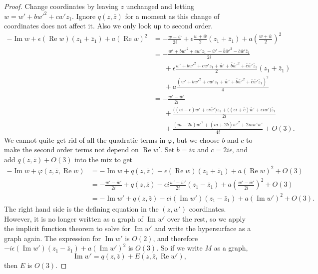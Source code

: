 \documentclass[12pt,openany]{book}
\renewcommand{\Re}{\operatorname{Re}}
\renewcommand{\Im}{\operatorname{Im}}
\theoremstyle{plain}
\theoremstyle{remark}
\theoremstyle{definition}
\theoremstyle{exercise}
\theoremstyle{example}
\begin{document}
\begin{proof}
Change coordinates
by leaving $z$ unchanged and letting $w = w'+bw'^2+cw'z_1$.  Ignore $q(z,\bar{z})$ for a moment as
this change of coordinates does not affect it.  Also we only look up to
second order.
\begin{equation*}
\begin{split}
-\Im w +
\epsilon (\Re w) (z_1+\bar{z}_1)
+
a {(\Re w)}^2
& =
-\frac{w-\bar{w}}{2i} +
\epsilon \frac{w+\bar{w}}{2}(z_1+\bar{z}_1)
+
a{\left(\frac{w+\bar{w}}{2}\right)}^2
\\
& =
-\frac{w'+bw'^2+cw'z_1-\bar{w}'-\bar{b}\bar{w}'^2-\bar{c}\bar{w}'\bar{z}_1}{2i} 
\\
& \phantom{=}~
+\epsilon \frac{w'+bw'^2+cw'z_1+\bar{w}'+\bar{b}\bar{w}'^2+\bar{c}\bar{w}'\bar{z}_1}{2}(z_1+\bar{z}_1)
\\
& \phantom{=}~
+ a \frac{{(w'+bw'^2+cw'z_1+\bar{w}'+\bar{b}\bar{w}'^2+\bar{c}\bar{w}'\bar{z}_1)}^2}{4}
\\
& =
-\frac{w'-\bar{w}'}{2i} 
\\
& \phantom{=}~
+\frac{
\bigl((\epsilon i-c)w'
+\epsilon i\bar{w}'\bigr)z_1
+\bigl((\epsilon i+\bar{c})\bar{w}'
+\epsilon iw'\bigr)\bar{z}_1
}{2i}
\\
& \phantom{=}~
+ \frac{(ia-2b)w'^2+(ia+2\bar{b})\bar{w}'^2+2iaw'\bar{w}'}{4i}
+O(3) .
\end{split}
\end{equation*}
We cannot quite get rid of all the quadratic terms in $\varphi$, but we 
choose $b$ and $c$ to make the second order terms not depend on $\Re w'$.
Set $b=ia$ and $c=2i\epsilon$, and add $q(z,\bar{z}) + O(3)$ into the mix
to get
\begin{equation*}
\begin{split}
-\Im w + \varphi(z,\bar{z},\Re w) & =
-\Im w +
q(z,\bar{z}) +
\epsilon (\Re w) (z_1+\bar{z}_1)
+ a{(\Re w)}^2
+O(3)
\\
& =
-\frac{w'-\bar{w}'}{2i} 
+
q(z,\bar{z}) 
- \epsilon i
\frac{w' -\bar{w}'}{2i}
( z_1 -\bar{z}_1)
+ a {\left(\frac{w'-\bar{w}'}{2i}\right)}^2
+O(3)
\\
& =
-\Im w'
+ q(z,\bar{z})
-
\epsilon i
(\Im w')
( z_1 -\bar{z}_1)
+
a {(\Im w')}^2
+O(3) .
\end{split}
\end{equation*}
The right hand side is the defining equation in the $(z,w')$ coordinates.
However, it is no longer written as a graph of $\Im w'$ over the
rest, so we apply the implicit
function theorem to solve for $\Im w'$
and write the hypersurface as a graph again.
The expression for $\Im w'$
is $O(2)$, and therefore $-i\epsilon (\Im w')(z_1-\bar{z}_1)+a{(\Im w')}^2$
is $O(3)$.
So if we write $M$ as a graph,
\begin{equation*}
\Im w' = q(z,\bar{z}) + E(z,\bar{z},\Re w'),
\end{equation*}
then $E$ is $O(3)$.


\end{proof}
\end{document}

